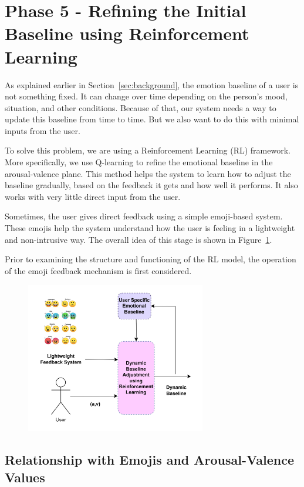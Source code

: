 \section{Phase 5 - Refining the Initial Baseline using Reinforcement Learning}

As explained earlier in Section~\ref{sec:background}, the emotion baseline of a user is not something fixed. It can change over time depending on the person's mood, situation, and other conditions. Because of that, our system needs a way to update this baseline from time to time. But we also want to do this with minimal inputs from the user.

To solve this problem, we are using a Reinforcement Learning (RL) framework. More specifically, we use Q-learning to refine the emotional baseline in the arousal-valence plane. This method helps the system to learn how to adjust the baseline gradually, based on the feedback it gets and how well it performs. It also works with very little direct input from the user.

Sometimes, the user gives direct feedback using a simple emoji-based system. These emojis help the system understand how the user is feeling in a lightweight and non-intrusive way. The overall idea of this stage is shown in Figure~\ref{fig:phase5}.

Prior to examining the structure and functioning of the RL model, the operation of the emoji feedback mechanism is first considered.

\begin{figure}[h]
    \centering
    \includegraphics[width=0.7\textwidth]{img/chapter_03/Phase5.jpg}
    \label{fig:phase5}
\end{figure}


\subsection{Relationship with Emojis and Arousal-Valence Values}

